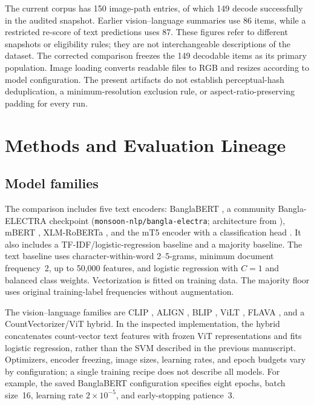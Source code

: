 \documentclass[11pt]{article}
\begin{document}
The current corpus has 150 image-path entries, of which 149 decode successfully in the audited snapshot. Earlier vision--language summaries use 86 items, while a restricted re-score of text predictions uses 87. These figures refer to different snapshots or eligibility rules; they are not interchangeable descriptions of the dataset. The corrected comparison freezes the 149 decodable items as its primary population. Image loading converts readable files to RGB and resizes according to model configuration. The present artifacts do not establish perceptual-hash deduplication, a minimum-resolution exclusion rule, or aspect-ratio-preserving padding for every run.

\section{Methods and Evaluation Lineage}\label{sec:methods}
\subsection{Model families}
The comparison includes five text encoders: BanglaBERT \citep{bhattacharjee2022banglabert}, a community Bangla-ELECTRA checkpoint (\texttt{monsoon-nlp/bangla-electra}; architecture from \citealp{clark2020electra}), mBERT \citep{devlin2019bert}, XLM-RoBERTa \citep{conneau2020xlmr}, and the mT5 encoder with a classification head \citep{xue2021mt5}. It also includes a TF-IDF/logistic-regression baseline and a majority baseline. The text baseline uses character-within-word 2--5-grams, minimum document frequency~2, up to 50,000 features, and logistic regression with $C=1$ and balanced class weights. Vectorization is fitted on training data. The majority floor uses original training-label frequencies without augmentation.

The vision--language families are CLIP \citep{radford2021clip}, ALIGN \citep{jia2021align}, BLIP \citep{li2022blip}, ViLT \citep{kim2021vilt}, FLAVA \citep{singh2022flava}, and a CountVectorizer/ViT hybrid. In the inspected implementation, the hybrid concatenates count-vector text features with frozen ViT representations and fits logistic regression, rather than the SVM described in the previous manuscript. Optimizers, encoder freezing, image sizes, learning rates, and epoch budgets vary by configuration; a single training recipe does not describe all models. For example, the saved BanglaBERT configuration specifies eight epochs, batch size~16, learning rate $2\times10^{-5}$, and early-stopping patience~3.
\end{document}
